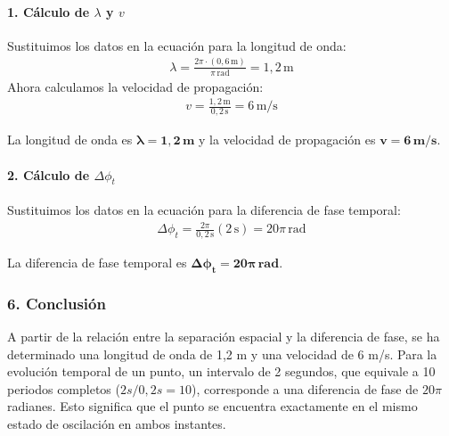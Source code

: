 \paragraph{1. Cálculo de $\lambda$ y $v$}
Sustituimos los datos en la ecuación para la longitud de onda:
\begin{gather}
    \lambda = \frac{2\pi \cdot (0,6 \, \text{m})}{\pi \, \text{rad}} = 1,2 \, \text{m}
\end{gather}
Ahora calculamos la velocidad de propagación:
\begin{gather}
    v = \frac{1,2 \, \text{m}}{0,2 \, \text{s}} = 6 \, \text{m/s}
\end{gather}
\begin{cajaresultado}
    La longitud de onda es $\boldsymbol{\lambda = 1,2 \, \textbf{m}}$ y la velocidad de propagación es $\boldsymbol{v = 6 \, \textbf{m/s}}$.
\end{cajaresultado}

\paragraph{2. Cálculo de $\Delta\phi_t$}
Sustituimos los datos en la ecuación para la diferencia de fase temporal:
\begin{gather}
    \Delta\phi_t = \frac{2\pi}{0,2 \, \text{s}} (2 \, \text{s}) = 20\pi \, \text{rad}
\end{gather}
\begin{cajaresultado}
    La diferencia de fase temporal es $\boldsymbol{\Delta\phi_t = 20\pi \, \textbf{rad}}$.
\end{cajaresultado}

\subsubsection*{6. Conclusión}
\begin{cajaconclusion}
A partir de la relación entre la separación espacial y la diferencia de fase, se ha determinado una longitud de onda de 1,2 m y una velocidad de 6 m/s. Para la evolución temporal de un punto, un intervalo de 2 segundos, que equivale a 10 periodos completos ($2s / 0,2s = 10$), corresponde a una diferencia de fase de $20\pi$ radianes. Esto significa que el punto se encuentra exactamente en el mismo estado de oscilación en ambos instantes.
\end{cajaconclusion}

\newpage

